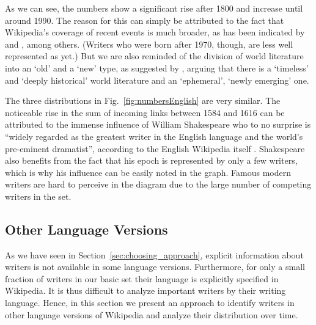 \documentclass[a4paper,12pt]{scrartcl}
\begin{document}
As we can see, the numbers show a significant rise after 1800 and
increase until around 1990. The reason for this can simply be
attributed to the fact that Wikipedia's coverage of recent events is
much broader, as has been indicated by \cite{denning2005risks} and
\cite{Elvebakk2008Philosophy}, among others.  (Writers who were born
after 1970, though, are less well represented as yet.)  But we are
also reminded of the division of world literature into an `old' and a
`new' type, as suggested by \cite{levine2013what}, arguing that there
is a `timeless' and `deeply historical' world literature and an
`ephemeral', `newly emerging' one.

The three distributions in Fig.~\ref{fig:numbersEnglish} are very
similar. The noticeable rise in the sum of incoming links between 1584
and 1616 can be attributed to the immense influence of William
Shakespeare who to no surprise is ``widely regarded as the greatest
writer in the English language and the world's pre-eminent
dramatist'', according to the English Wikipedia
itself \cite{wp:shakespeare}. %
%
Shakespeare also benefits from the fact that his epoch is represented
by only a few writers, which is why his influence can be easily noted
in the graph. Famous modern writers are hard to perceive in the diagram
due to the large number of competing writers in the set.
%




\subsection{Other Language Versions}\label{sec:other-lang-vers}

As we have seen in Section~\ref{sec:choosing_approach}, explicit
information about writers is not available in some language
versions. Furthermore, for only a small fraction of writers in our
basic set their language is explicitly specified in Wikipedia. It
is thus difficult to analyze important writers by their writing
language. Hence, in this section we present an approach to
identify writers in other language versions of Wikipedia and analyze
their distribution over time.
\end{document}
